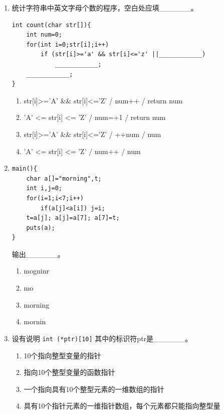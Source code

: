 \documentclass[a4paper,12pt]{article}
\begin{document}
\begin{enumerate}
	\item 统计字符串中英文字母个数的程序，空白处应填\_\_\_\_\_\_。
	      \begin{verbatim}
int count(char str[]){
    int num=0;
    for(int i=0;str[i];i++)
        if (str[i]>='a' && str[i]<='z' ||____________)
            ____________;
    ____________;
}
    \end{verbatim}
	      \begin{enumerate}
		      \item[A)] str[i]>='A' \&\& str[i]<='Z' / num++ / return num
		      \item[B)] 'A' <= str[i] <= 'Z' / num=+1 / return num
		      \item[C)] str[i]>='A' \&\& str[i]<='Z' / ++num / num
		      \item[D)] 'A' <= str[i] <= 'Z' / num++ / num
	      \end{enumerate}
	      \vspace{0.3cm}

	\item
	      \begin{verbatim}
main(){
    char a[]="morning",t;
    int i,j=0;
    for(i=1;i<7;i++)
        if(a[j]<a[i]) j=i;
    t=a[j]; a[j]=a[7]; a[7]=t;
    puts(a);
}
    \end{verbatim}
	      输出\_\_\_\_\_\_。
	      \begin{enumerate}
		      \item[A)] mogninr
		      \item[B)] mo
		      \item[C)] morning
		      \item[D] mornin
	      \end{enumerate}
	      \vspace{0.3cm}

	\item 设有说明 \texttt{int (*ptr)[10]} 其中的标识符ptr是\_\_\_\_\_\_。
	      \begin{enumerate}
		      \item[A)] 10个指向整型变量的指针
		      \item[B)] 指向10个整型变量的函数指针
		      \item[C)] 一个指向具有10个整型元素的一维数组的指针
		      \item[D)] 具有10个指针元素的一维指针数组，每个元素都只能指向整型量
	      \end{enumerate}
	      \vspace{0.3cm}
\end{enumerate}
\end{document}
